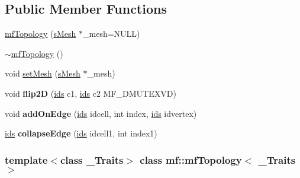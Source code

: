 \subsection*{Public Member Functions}
\begin{DoxyCompactItemize}
\item 
\hyperlink{classmf_1_1mfTopology_a213c2ba69040e9a30afad65e2301e668}{mfTopology} (\hyperlink{classmf_1_1mfTopology_adea65e34b93c17858d4dadc6eb360711}{sMesh} $\ast$\_\-mesh=NULL)
\item 
\hyperlink{classmf_1_1mfTopology_a92dcb0023e0d0a87fd1e1bc589e99aa6}{$\sim$mfTopology} ()
\item 
void \hyperlink{classmf_1_1mfTopology_a01b3e8e3f6fc62b82f5e11c4e1a689ad}{setMesh} (\hyperlink{classmf_1_1mfTopology_adea65e34b93c17858d4dadc6eb360711}{sMesh} $\ast$\_\-mesh)
\item 
\hypertarget{classmf_1_1mfTopology_a7ad6af3886655bd17a950df25f6635cf}{
void {\bfseries flip2D} (\hyperlink{classmf_1_1mfTopology_ab491100e8580485911e86e63fe3cdaed}{ids} c1, \hyperlink{classmf_1_1mfTopology_ab491100e8580485911e86e63fe3cdaed}{ids} c2 MF\_\-DMUTEXVD)}
\label{classmf_1_1mfTopology_a7ad6af3886655bd17a950df25f6635cf}

\item 
\hypertarget{classmf_1_1mfTopology_a00ee8a22304d976a8cbdb049a081d6a7}{
void {\bfseries addOnEdge} (\hyperlink{classmf_1_1mfTopology_ab491100e8580485911e86e63fe3cdaed}{ids} idcell, int index, \hyperlink{classmf_1_1mfTopology_ab491100e8580485911e86e63fe3cdaed}{ids} idvertex)}
\label{classmf_1_1mfTopology_a00ee8a22304d976a8cbdb049a081d6a7}

\item 
\hypertarget{classmf_1_1mfTopology_a1fad4025023fa575cb568035a587ee5e}{
\hyperlink{classmf_1_1mfTopology_ab491100e8580485911e86e63fe3cdaed}{ids} {\bfseries collapseEdge} (\hyperlink{classmf_1_1mfTopology_ab491100e8580485911e86e63fe3cdaed}{ids} idcell1, int index1)}
\label{classmf_1_1mfTopology_a1fad4025023fa575cb568035a587ee5e}

\end{DoxyCompactItemize}
\subsubsection*{template$<$class \_\-Traits$>$ class mf::mfTopology$<$ \_\-Traits $>$}



